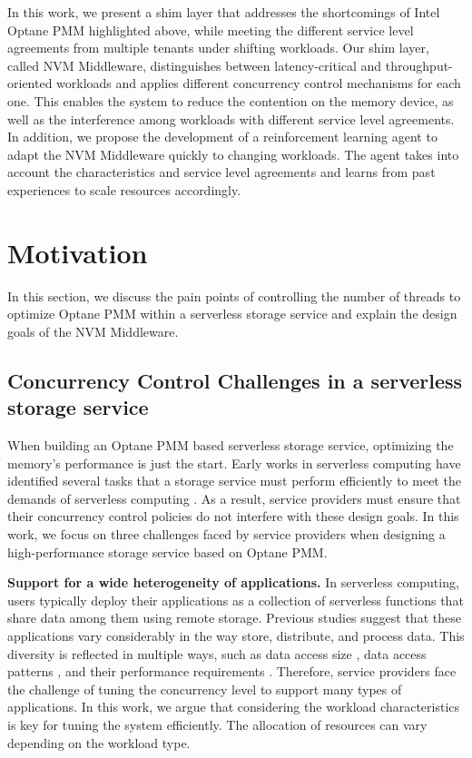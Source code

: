 In this work, we present a shim layer that addresses the shortcomings of Intel Optane PMM highlighted above, while meeting the different service level agreements from multiple tenants under shifting workloads. Our shim layer, called NVM Middleware, distinguishes between latency-critical and throughput-oriented workloads and applies different concurrency control mechanisms for each one. This enables the system to reduce the contention on the memory device, as well as the interference among workloads with different service level agreements. In addition, we propose the development of a reinforcement learning agent to adapt the NVM Middleware quickly to changing workloads. The agent takes into account the characteristics and service level agreements and learns from past experiences to scale resources accordingly.


\section{Motivation}
In this section, we discuss the pain points of controlling the number of threads to optimize Optane PMM within a serverless storage service and explain the design goals of the NVM Middleware.

\subsection{Concurrency Control Challenges in a serverless storage service}

When building an Optane PMM based serverless storage service, optimizing the memory's performance is just the start. Early works in serverless computing have identified several tasks that a storage service must perform efficiently to meet the demands of serverless computing \cite{180275,jonas2019cloud,klimovic2018understanding,klimovic2018pocket,wu2019autoscaling,romero2021faat}. As a result, service providers must ensure that their concurrency control policies do not interfere with these design goals. In this work, we focus on three challenges faced by service providers when designing a high-performance storage service based on Optane PMM.

\textbf{Support for a wide heterogeneity of applications.} In serverless computing, users typically deploy their applications as a collection of serverless functions that share data among them using remote storage. Previous studies suggest that these applications vary considerably in the way store, distribute, and process data. This diversity is reflected in multiple ways, such as data access size \cite{klimovic2018pocket,romero2021faat}, data access patterns \cite{romero2021faat}, and their performance requirements \cite{180275,jonas2019cloud}. Therefore, service providers face the challenge of tuning the concurrency level to support many types of applications. In this work, we argue that considering the workload characteristics is key for tuning the system efficiently. The allocation of resources can vary depending on the workload type.


